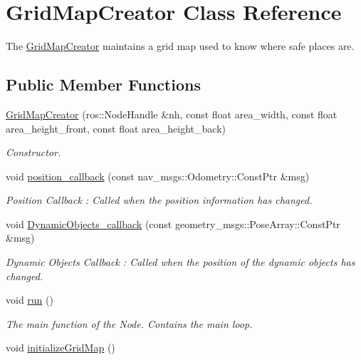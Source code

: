 \hypertarget{classGridMapCreator}{}\section{Grid\+Map\+Creator Class Reference}
\label{classGridMapCreator}


The \hyperlink{classGridMapCreator}{Grid\+Map\+Creator} maintains a grid map used to know where safe places are.  


\subsection*{Public Member Functions}
\begin{DoxyCompactItemize}
\item 
\hyperlink{classGridMapCreator_a5df28e4b4af91aa6b0b11bca03264062}{Grid\+Map\+Creator} (ros\+::\+Node\+Handle \&nh, const float area\+\_\+width, const float area\+\_\+height\+\_\+front, const float area\+\_\+height\+\_\+back)
\begin{DoxyCompactList}\small\item\em Constructor. \end{DoxyCompactList}\item 
void \hyperlink{classGridMapCreator_a5b4b8966d53d30fad9ceca477690f452}{position\+\_\+callback} (const nav\+\_\+msgs\+::\+Odometry\+::\+Const\+Ptr \&msg)
\begin{DoxyCompactList}\small\item\em Position Callback \+: Called when the position information has changed. \end{DoxyCompactList}\item 
void \hyperlink{classGridMapCreator_a3ed1c6283cdc380092e1fdeee372341b}{Dynamic\+Objects\+\_\+callback} (const geometry\+\_\+msgs\+::\+Pose\+Array\+::\+Const\+Ptr \&msg)
\begin{DoxyCompactList}\small\item\em Dynamic Objects Callback \+: Called when the position of the dynamic objects has changed. \end{DoxyCompactList}\item 
void \hyperlink{classGridMapCreator_af7a6dbee626737eddbfc91681d6730a5}{run} ()
\begin{DoxyCompactList}\small\item\em The main function of the Node. Contains the main loop. \end{DoxyCompactList}\item 
void \hyperlink{classGridMapCreator_af222d2b22ad9d566c35383dafa056d3e}{initialize\+Grid\+Map} ()

\end{DoxyCompactItemize}
